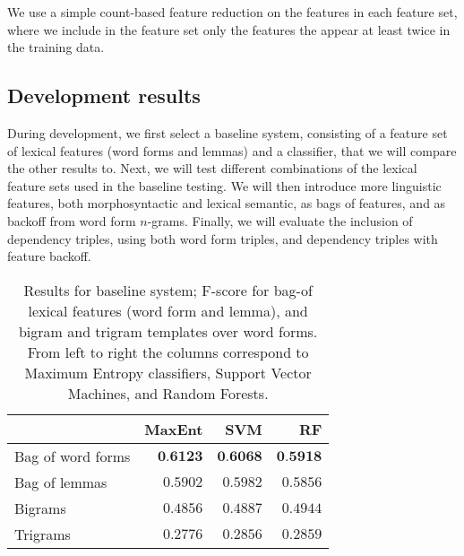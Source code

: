 \documentclass[11pt,letterpaper]{article}
\begin{document}
We use a simple count-based feature reduction on the features in each feature set, where we include in the feature set only the features the appear at least twice in the training data.


\subsection{Development results}

During development, we first select a baseline system, consisting of a feature set of lexical features (word forms and lemmas) and a classifier, that we will compare the other results to. Next, we will test different combinations of the lexical feature sets used in the baseline testing. We will then introduce more linguistic features, both morphosyntactic and lexical semantic, as bags of features, and as backoff from word form $n$-grams. Finally, we will evaluate the inclusion of dependency triples, using both word form triples, and dependency triples with feature backoff.

\begin{table}
  \begin{smaller}
    \begin{center}
      \begin{tabular}{lrrr}
        \toprule

        & MaxEnt & SVM & RF \\
        \midrule
        Bag of word forms & $\textbf{0.6123}$ & $\textbf{0.6068}$ & $\textbf{0.5918}$ \\ %
        Bag of lemmas & $0.5902$ & $0.5982$ & $0.5856$ \\
        Bigrams & $0.4856$ & $0.4887$ & $0.4944$ \\
        Trigrams & $0.2776$ & $0.2856$ & $0.2859$ \\
      
      
        \bottomrule
      \end{tabular}
    \end{center}
    \caption{Results for baseline system; F-score for bag-of lexical features
      (word form and lemma), and bigram and trigram templates over word
      forms. From left to right the columns correspond to Maximum Entropy
      classifiers, Support Vector Machines, and Random Forests.}
    \label{tab:baseline}
  \end{smaller}
\end{table}
\end{document}
